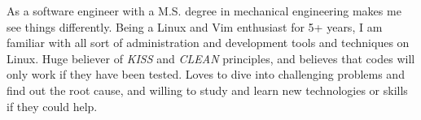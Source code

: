 

\begin{cvparagraph}

As a software engineer with a M.S. degree in mechanical engineering makes me see things differently. Being a Linux and Vim enthusiast for 5+ years, I am familiar with all sort of administration and development tools and techniques on Linux. Huge believer of \textit{KISS} and \textit{CLEAN} principles, and believes that codes will only work if they have been tested. Loves to dive into challenging problems and find out the root cause, and willing to study and learn new technologies or skills if they could help.
\end{cvparagraph}
